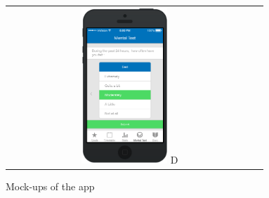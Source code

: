 \documentclass[a4paper, 11pt, titlepage]{article}
\begin{document}
\begin{figure}[H]
\begin{tabular}{cc}
		\includegraphics[width=0.36\textwidth]{figures/mockups/mtds-2.png} D 
	\end{tabular}
	\caption{Mock-ups of the app}
	\label{fig:mockups}
\end{figure}
\end{document}
